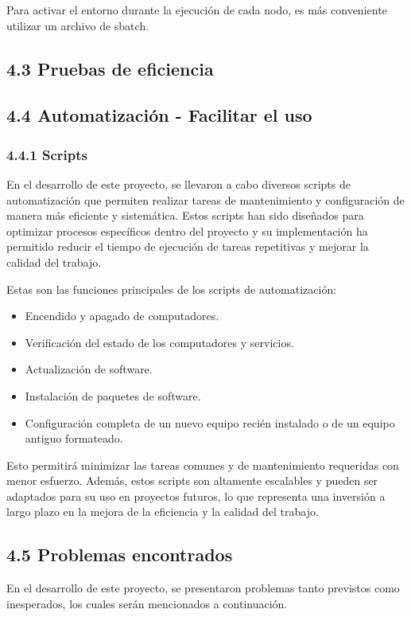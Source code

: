 \begin{spacing}{1.5}
    Para activar el entorno durante la ejecución de cada nodo, es más conveniente utilizar un archivo de sbatch.



    \subsection{4.3 Pruebas de eficiencia}

    \subsection{4.4 Automatización - Facilitar el uso}

    \subsubsection{4.4.1 Scripts}

    En el desarrollo de este proyecto, se llevaron a cabo diversos scripts de automatización que permiten realizar tareas de mantenimiento y configuración de manera más eficiente y sistemática. Estos scripts han sido diseñados para optimizar procesos específicos dentro del proyecto y su implementación ha permitido reducir el tiempo de ejecución de tareas repetitivas y mejorar la calidad del trabajo.

    Estas son las funciones principales de los scripts de automatización:

    \begin{itemize}
        \item Encendido y apagado de computadores.
        \item Verificación del estado de los computadores y servicios.
        \item Actualización de software.
        \item Instalación de paquetes de software.
        \item Configuración completa de un nuevo equipo recién instalado o de un equipo antiguo formateado.
    \end{itemize}
   
    Esto permitirá minimizar las tareas comunes y de mantenimiento requeridas con menor esfuerzo. Además, estos scripts son altamente escalables y pueden ser adaptados para su uso en proyectos futuros, lo que representa una inversión a largo plazo en la mejora de la eficiencia y la calidad del trabajo.

\subsection{4.5 Problemas encontrados}
En el desarrollo de este proyecto, se presentaron problemas tanto previstos como inesperados, los cuales serán mencionados a continuación.


\end{spacing}
